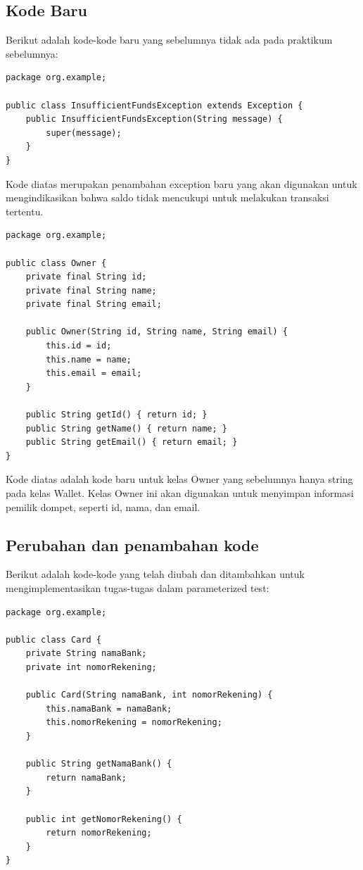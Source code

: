 \documentclass[a4paper,12pt]{article}
\begin{document}
\subsection{Kode Baru}
Berikut adalah kode-kode baru yang sebelumnya tidak ada pada praktikum sebelumnya:

\begin{lstlisting}[style=javastyle, caption=InsufficientFundsException.java]
package org.example;

public class InsufficientFundsException extends Exception {
    public InsufficientFundsException(String message) {
        super(message);
    }
}
\end{lstlisting}

Kode diatas merupakan penambahan exception baru yang akan digunakan untuk mengindikasikan bahwa saldo tidak mencukupi untuk melakukan transaksi tertentu.

\begin{lstlisting}[style=javastyle, caption=Owner.java]
package org.example;

public class Owner {
    private final String id;
    private final String name;
    private final String email;

    public Owner(String id, String name, String email) {
        this.id = id;
        this.name = name;
        this.email = email;
    }

    public String getId() { return id; }
    public String getName() { return name; }
    public String getEmail() { return email; }
}
\end{lstlisting}

Kode diatas adalah kode baru untuk kelas Owner yang sebelumnya hanya string pada kelas Wallet. Kelas Owner ini akan digunakan untuk menyimpan informasi pemilik dompet, seperti id, nama, dan email.

\subsection{Perubahan dan penambahan kode}
Berikut adalah kode-kode yang telah diubah dan ditambahkan untuk mengimplementasikan tugas-tugas dalam parameterized test:
\begin{lstlisting}[style=javastyle, caption=Card.java]
package org.example;

public class Card {
    private String namaBank;
    private int nomorRekening;

    public Card(String namaBank, int nomorRekening) {
        this.namaBank = namaBank;
        this.nomorRekening = nomorRekening;
    }

    public String getNamaBank() {
        return namaBank;
    }

    public int getNomorRekening() {
        return nomorRekening;
    }
}
\end{lstlisting}
\end{document}
